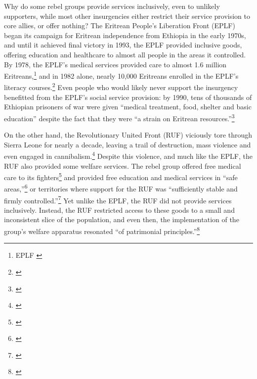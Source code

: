 \documentclass[12pt, letterpaper]{article}
\begin{document}
Why do some rebel groups provide services inclusively, even to unlikely supporters, while most other insurgencies either restrict their service provision to core allies, or offer nothing? The Eritrean People's Liberation Front (EPLF) began its campaign for Eritrean independence from Ethiopia in the early 1970s, and until it achieved final victory in 1993, the EPLF provided inclusive goods, offering education and healthcare to almost all people in the areas it controlled. By 1978, the EPLF's medical services provided care to almost 1.6 million Eritreans,\footnote{EPLF \citeyear[91]{selected82}} and in 1982 alone, nearly 10,000 Eritreans enrolled in the EPLF's literacy courses.\footnote{\citealt[19]{desta2009does}} Even people who would likely never support the insurgency benefitted from the EPLF's social service provision: by 1990, tens of thousands of Ethiopian prisoners of war were given ``medical treatment, food, shelter and basic education'' despite the fact that they were ``a strain on Eritrean resources.''\footnote{\citealt[91]{wilson1991challenge}} 

On the other hand, the Revolutionary United Front (RUF) viciously tore through Sierra Leone for nearly a decade, leaving a trail of destruction, mass violence and even engaged in cannibalism.\footnote{\citealt[172-3]{peters2011war}} Despite this violence, and much like the EPLF, the RUF also provided some welfare services. The rebel group offered free medical care to its fighters\footnote{\citealt[122]{peters2011war}} and provided free education and medical services in ``safe areas,''\footnote{\citealt[119]{peters2011war}} or territories where support for the RUF was ``sufficiently stable and firmly controlled.''\footnote{\citealt[119]{peters2011war}} Yet unlike the EPLF, the RUF did not provide services inclusively. Instead, the RUF restricted access to these goods to a small and inconsistent slice of the population, and even then, the implementation of the group's welfare apparatus resonated ``of patrimonial principles.''\footnote{\citealt[123]{peters2011war}}%
\end{document}

